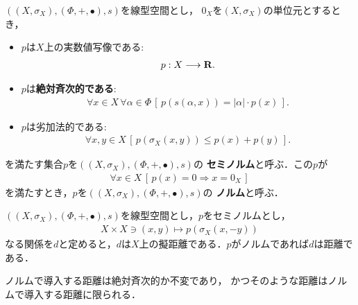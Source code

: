 	\begin{screen}
		\begin{dfn}[ノルム]
			$\left(\left(X,\sigma_X\right),(\Phi,+,\bullet),s\right)$を線型空間とし，
			$0_X$を$\left(X,\sigma_X\right)$の単位元とするとき，
			\begin{itemize}
				\item $p$は$X$上の実数値写像である:
					\begin{align}
						p:X \longrightarrow \mathbf{R}.
					\end{align}
					
				\item $p$は{\bf 絶対斉次的である}:
					\begin{align}
						\forall x \in X\, \forall \alpha \in \Phi\, 
						\left[\, p\left(s(\alpha,x)\right) = |\alpha| \cdot p(x)\, \right].
					\end{align}
					
				\item $p$は劣加法的である:
					\begin{align}
						\forall x,y \in X\, \left[\, p\left(\sigma_X\left(x,y\right)\right) 
						\leq p(x) + p(y)\, \right].
					\end{align}
			\end{itemize}
			を満たす集合$p$を$\left(\left(X,\sigma_X\right),(\Phi,+,\bullet),s\right)$の
			{\bf セミノルム}と呼ぶ．この$p$が
			\begin{align}
				\forall x \in X\, \left[\, p(x) = 0 \Longrightarrow x = 0_X\, \right]
			\end{align}
			を満たすとき，$p$を$\left(\left(X,\sigma_X\right),(\Phi,+,\bullet),s\right)$の
			{\bf ノルム}と呼ぶ．
		\end{dfn}
	\end{screen}
	
	$\left(\left(X,\sigma_X\right),(\Phi,+,\bullet),s\right)$を線型空間とし，$p$をセミノルムとし，
	\begin{align}
		X \times X \ni (x,y) \longmapsto p\left(\sigma_X\left(x,-y\right)\right)
	\end{align}
	なる関係を$d$と定めると，$d$は$X$上の擬距離である．$p$がノルムであれば$d$は距離である．
	
	\begin{screen}
		\begin{thm}[絶対斉次的な不変距離はノルムで導入する距離に限られる]
			ノルムで導入する距離は絶対斉次的か不変であり，
			かつそのような距離はノルムで導入する距離に限られる．
		\end{thm}
	\end{screen}
	
